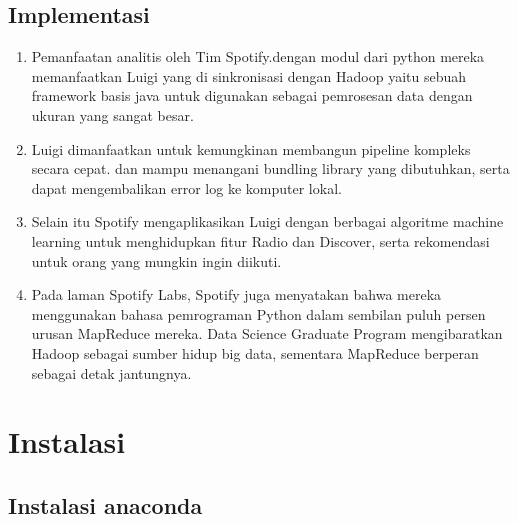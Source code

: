 \documentclass{article}
\begin{document}
\subsection{Implementasi}
\usepackage{Untuk kali ini saya mengambil contoh beberapa platform yang menggunakan python dalam analisis data, platform terbaru dan terpopuler saat ini yaitu spotify dan netflix. Dalam penerapannya kedua platform ini, utamanya terlihat pada bagaimana Spotify merekomendasikan lagu dan Netflix merekomendasikan film kepada para pelanggannya. berikut merupakan poin-poin tentang implementasi python dalam analisis data spotify:}
\begin{enumerate}
    \item Pemanfaatan analitis oleh Tim Spotify.dengan modul dari python mereka memanfaatkan Luigi yang di sinkronisasi dengan Hadoop yaitu sebuah framework basis java untuk digunakan sebagai pemrosesan data dengan ukuran yang sangat besar.
    \item Luigi dimanfaatkan untuk kemungkinan membangun pipeline kompleks secara cepat. dan mampu menangani bundling library yang dibutuhkan, serta dapat mengembalikan error log ke komputer lokal.
    \item Selain itu Spotify mengaplikasikan Luigi dengan berbagai algoritme machine learning untuk menghidupkan fitur Radio dan Discover, serta rekomendasi untuk orang yang mungkin ingin diikuti.
    \item Pada laman Spotify Labs, Spotify juga menyatakan bahwa mereka menggunakan bahasa pemrograman Python dalam sembilan puluh persen urusan MapReduce mereka. Data Science Graduate Program mengibaratkan Hadoop sebagai sumber hidup big data, sementara MapReduce berperan sebagai detak jantungnya.
\end{enumerate}

\section{Instalasi}
\graphicspath{{gambar/anaconda}}
\subsection{Instalasi anaconda}
\end{document}
